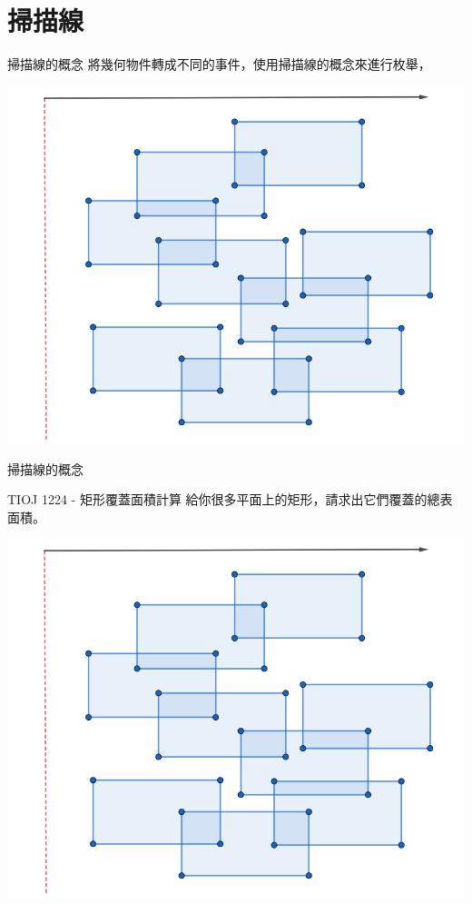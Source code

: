 \documentclass[aspectratio=169]{beamer}
\begin{document}
\section{掃描線}

\begin{frame}{掃描線的概念}
    將幾何物件轉成不同的事件，使用掃描線的概念來進行枚舉，
    \begin{center}
        \includegraphics[scale=0.35]{images/sweepline.png}
    \end{center}
\end{frame}

\begin{frame}{掃描線的概念}
    \begin{block}{TIOJ 1224 - 矩形覆蓋面積計算}
        給你很多平面上的矩形，請求出它們覆蓋的總表面積。
    \end{block}
    \begin{center}
        \includegraphics[scale=0.2]{images/sweepline.png}
    \end{center}
\end{frame}
\end{document}

